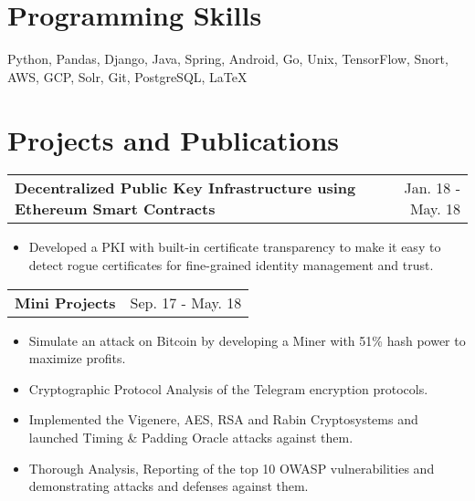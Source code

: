 \documentclass[a4paper,10pt]{article}
\makeatletter
\newcommand{\projectHeading}[2]{
    \begin{tabular*}{1\textwidth}{l@{\extracolsep{\fill}}r}
      \large{\textbf{#1}} & \small{#2} 
    \end{tabular*}
}
\newcommand{\resumeItemListStart}{\begin{itemize}[topsep=3pt, parsep=1pt, listparindent=0pt, itemindent=0pt, itemsep=0.5pt, leftmargin=*]}
\newcommand{\resumeItemListEnd}{\end{itemize}}
\makeatother
\begin{document}
 
    

\section{Programming Skills}
\hspace*{5pt} \small{Python, Pandas, Django, \hfill{} Java, Spring, Android, Go, Unix, \hfill{} TensorFlow, Snort, \hfill{} AWS, GCP, \hfill{} Solr, \hfill{} Git, PostgreSQL, \LaTeX}
		

\section{Projects and Publications}
    
    \projectHeading{Decentralized Public Key Infrastructure using Ethereum Smart Contracts}{Jan. 18 - May. 18} 
    \resumeItemListStart
     \item\small{Developed a PKI with built-in certificate transparency to make it easy to detect rogue certificates for fine-grained identity management and trust.}
    \resumeItemListEnd
    
    \projectHeading{Mini Projects}{Sep. 17 - May. 18} 
    \resumeItemListStart
    	 \item\small{Simulate an attack on Bitcoin by developing a Miner with 51\% hash power to maximize profits.}
    	 \item\small{Cryptographic Protocol Analysis of the Telegram encryption protocols.}
    	 \item\small{Implemented the Vigenere, AES, RSA and Rabin Cryptosystems and launched Timing \& Padding Oracle attacks against them.}
	     \item\small{Thorough Analysis, Reporting of the top 10 OWASP vulnerabilities and demonstrating attacks and defenses against them.}
    \resumeItemListEnd
    
\end{document}
